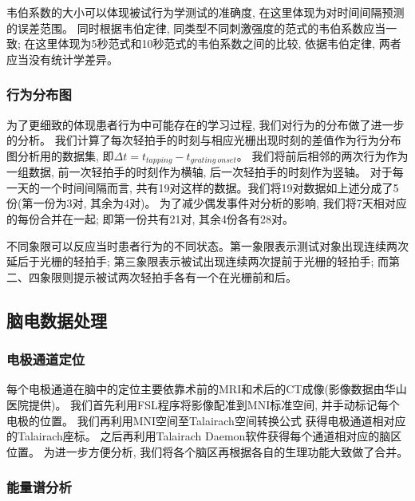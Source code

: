韦伯系数的大小可以体现被试行为学测试的准确度, 在这里体现为对时间间隔预测的误差范围。
同时根据韦伯定律, 同类型不同刺激强度的范式的韦伯系数应当一致;
在这里体现为5秒范式和10秒范式的韦伯系数之间的比较, 依据韦伯定律, 两者应当没有统计学差异。

\subsubsection{行为分布图}
为了更细致的体现患者行为中可能存在的学习过程, 我们对行为的分布做了进一步的分析。
我们计算了每次轻拍手的时刻与相应光栅出现时刻的差值作为行为分布图分析用的数据集, 即$\Delta t = t_{tapping} - t_{grating\ onset}$。
我们将前后相邻的两次行为作为一组数据, 前一次轻拍手的时刻作为横轴, 后一次轻拍手的时刻作为竖轴。
对于每一天的一个时间间隔而言, 共有19对这样的数据。我们将19对数据如上述分成了5份(第一份为3对, 其余为4对)。
为了减少偶发事件对分析的影响, 我们将7天相对应的每份合并在一起; 即第一份共有21对, 其余4份各有28对。

不同象限可以反应当时患者行为的不同状态。第一象限表示测试对象出现连续两次延后于光栅的轻拍手;
第三象限表示被试出现连续两次提前于光栅的轻拍手;
而第二、四象限则提示被试两次轻拍手各有一个在光栅前和后。

\subsection{脑电数据处理}

\subsubsection{电极通道定位}

每个电极通道在脑中的定位主要依靠术前的MRI和术后的CT成像(影像数据由华山医院提供)。
我们首先利用FSL程序\cite{fsl}将影像配准到MNI标准空间, 并手动标记每个电极的位置。
我们再利用MNI空间至Talairach空间转换公式\cite{bioelectromagnetism}
获得电极通道相对应的Talairach座标。
之后再利用Talairach Daemon软件\cite{talairach_daemon}获得每个通道相对应的脑区位置。
为进一步方便分析, 我们将各个脑区再根据各自的生理功能大致做了合并。

\subsubsection{能量谱分析}

